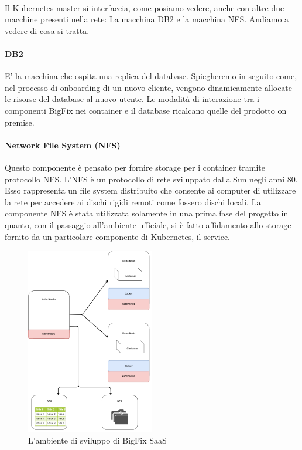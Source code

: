 \paragraph{}
Il Kubernetes master si interfaccia, come posiamo vedere, anche con altre due macchine presenti nella rete: La macchina DB2 e la macchina NFS. Andiamo a vedere di cosa si tratta.
\paragraph{DB2}
E' la macchina che ospita una replica del database. Spiegheremo in seguito come, nel processo di onboarding di un nuovo cliente, vengono dinamicamente allocate le risorse del database al nuovo utente. Le modalità di interazione tra i componenti BigFix nei container e il database ricalcano quelle del prodotto on premise.
\paragraph{Network File System (NFS)}
Questo componente è pensato per fornire storage per i container tramite protocollo NFS. L'NFS è un protocollo di rete sviluppato dalla Sun negli anni 80. Esso rappresenta un file system distribuito che consente ai computer di utilizzare la rete per accedere ai dischi rigidi remoti come fossero dischi locali. La componente NFS è stata utilizzata solamente in una prima fase del progetto in quanto, con il passaggio all'ambiente ufficiale, si è fatto affidamento allo storage fornito da un particolare componente di Kubernetes, il service. 

\begin{figure}[h!]
	\centering
	\includegraphics[width=0.5\textwidth,keepaspectratio=true]{capitoli/imgs/EnvironmentsComponentDiagram.png}
	\caption{L'ambiente di sviluppo di BigFix SaaS}
	\label{ambs}
\end{figure}


